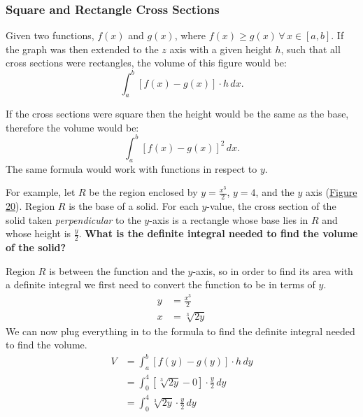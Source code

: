 \documentclass[12pt]{article}
\begin{document}
            \subsubsection{Square and Rectangle Cross Sections}
                Given two functions, $f(x)$ and $g(x)$, where $f(x) \ge g(x) \, \forall \, x \in [a, b]$. If the graph was then extended to the $z$ axis with a given height $h$, such that all cross sections were rectangles, the volume of this figure would be:
                \[ \int_a^b \left[ f(x) - g(x) \right] \cdot h \, dx. \]

                If the cross sections were square then the height would be the same as the base, therefore the volume would be:
                \[ \int_a^b \left[ f(x) - g(x) \right]^2 \, dx. \]
                The same formula would work with functions in respect to $y$.
                \bigskip

                For example, let $R$ be the region enclosed by $y=\frac{x^3}{2}$, $y=4$, and the $y$ axis (\hyperref[fig:srcross]{Figure 20}). Region $R$ is the base of a solid. For each $y$-value, the cross section of the solid taken \textit{perpendicular} to the $y$-axis is a rectangle whose base lies in $R$ and whose height is $\frac{y}{2}$. \textbf{What is the definite integral needed to find the volume of the solid?}

                \noindent Region $R$ is between the function and the $y$-axis, so in order to find its area with a definite integral we first need to convert the function to be in terms of $y$.
                \begin{align*}
                    y &= \frac{x^3}{2} \\[6pt]
                    x &= \sqrt[3]{2y}
                \end{align*}
                We can now plug everything in to the formula to find the definite integral needed to find the volume.
                \begin{align*}
                    V &= \int_a^b \left[ f(y) - g(y) \right] \cdot h \, dy \\
                    &= \int_0^4 \left[ \sqrt[3]{2y} - 0 \right] \cdot \frac{y}{2} \, dy \\[6pt]
                    &= \int_0^4 \sqrt[3]{2y} \cdot \frac{y}{2} \, dy
                \end{align*}
\end{document}
